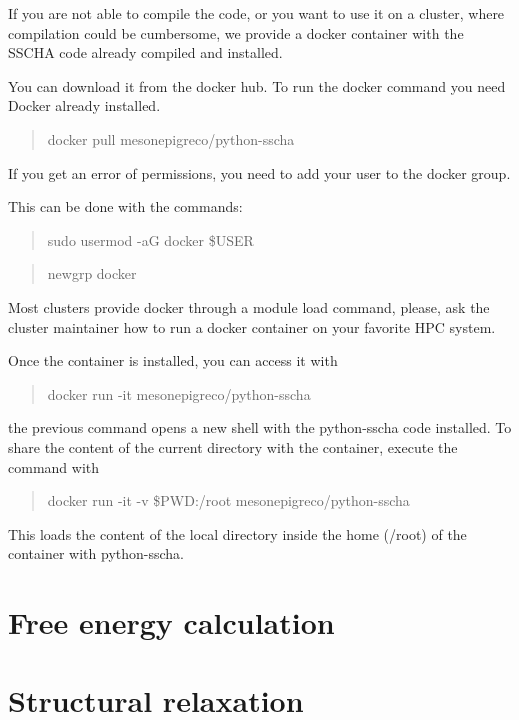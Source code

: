 \documentclass[]{report}
\begin{document}
If you are not able to compile the code, or you want to use it on a cluster, where compilation could be cumbersome, we provide a docker container with the SSCHA code already compiled and installed.

You can download it from the docker hub. To run the docker command you need Docker already installed.

\begin{quotation}
	docker pull mesonepigreco/python-sscha
\end{quotation}

If you get an error of permissions, you need to add your user to the docker group.

This can be done with the commands:

\begin{quotation}
	sudo usermod -aG docker \$USER
\end{quotation}
	
\begin{quotation}
		newgrp docker
\end{quotation}


Most clusters provide docker through a module load command, please, ask the cluster maintainer how to run a docker container on your favorite HPC system.

Once the container is installed, you can access it with

\begin{quotation}
	docker run -it mesonepigreco/python-sscha
\end{quotation}

the previous command opens a new shell with the python-sscha code installed. To share the content of the current directory with the container, execute the command with

\begin{quotation}
	docker run -it -v \$PWD:/root mesonepigreco/python-sscha
\end{quotation}

This loads the content of the local directory inside the home (/root) of the container with python-sscha.
\chapter{Free energy calculation}

\chapter{Structural relaxation}
\end{document}
